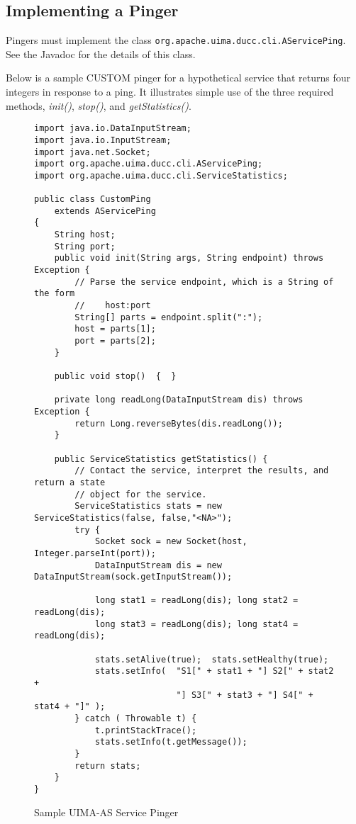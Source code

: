       
      \subsection{Implementing a Pinger}
      Pingers must implement the class {\tt org.apache.uima.ducc.cli.AServicePing}.  See the
      Javadoc for the details of this class.

      Below is a sample CUSTOM pinger for a hypothetical service that returns four integers in
      response to a ping.  It illustrates simple use of the three required methods, {\em init()},
      {\em stop()}, and {\em getStatistics()}.

      \begin{figure}[H]
\begin{verbatim}
import java.io.DataInputStream;
import java.io.InputStream;
import java.net.Socket;
import org.apache.uima.ducc.cli.AServicePing;
import org.apache.uima.ducc.cli.ServiceStatistics;

public class CustomPing
    extends AServicePing
{
    String host;
    String port;
    public void init(String args, String endpoint) throws Exception {
        // Parse the service endpoint, which is a String of the form 
        //    host:port
        String[] parts = endpoint.split(":");
        host = parts[1];
        port = parts[2];
    }

    public void stop()  {  }

    private long readLong(DataInputStream dis) throws Exception {
        return Long.reverseBytes(dis.readLong());
    }

    public ServiceStatistics getStatistics() {
        // Contact the service, interpret the results, and return a state
        // object for the service.
        ServiceStatistics stats = new ServiceStatistics(false, false,"<NA>");
        try {
            Socket sock = new Socket(host, Integer.parseInt(port));
            DataInputStream dis = new DataInputStream(sock.getInputStream());

            long stat1 = readLong(dis); long stat2 = readLong(dis); 
            long stat3 = readLong(dis); long stat4 = readLong(dis);

            stats.setAlive(true);  stats.setHealthy(true);
            stats.setInfo(  "S1[" + stat1 + "] S2[" + stat2 + 
                            "] S3[" + stat3 + "] S4[" + stat4 + "]" );
        } catch ( Throwable t) {
            t.printStackTrace();
            stats.setInfo(t.getMessage());
        }
        return stats;        
    }
}
\end{verbatim}
        \caption{Sample UIMA-AS Service Pinger}
        \label{fig:service.custom.pinger}

      \end{figure}
      
